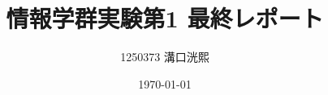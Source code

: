 \documentclass[a4j,11pt]{jsarticle}
\title{\vspace{0cm}情報学群実験第1 最終レポート}
\author{1250373 溝口洸熙}
\date{\today}
\begin{document}
\maketitle
\begin{abstract}

\end{abstract}
\end{document}
